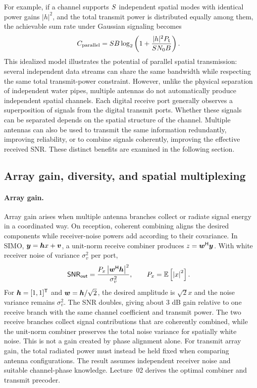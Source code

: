For example, if a channel supports $S$ independent
spatial modes with identical power gains $|h|^2$, and the total
transmit power is distributed equally among them, the achievable
sum rate under Gaussian signaling becomes
\begin{equation}
	C_{\mathrm{parallel}}
	=
	S B
	\log_2\left(
	1+
	\frac{|h|^2P_{\mathsf{t}}}
	{S N_{0} B}
	\right).
	\label{eq:parallel_channel_capacity_intro}
\end{equation}
This idealized model illustrates the potential of parallel spatial
transmission: several independent data streams can share the same
bandwidth while respecting the same total transmit-power constraint.
%
However, unlike the physical separation of independent water
pipes, multiple antennas do not automatically produce independent
spatial channels. Each digital receive port generally observes a superposition of signals from the digital transmit ports. Whether these signals can be separated depends on the
spatial structure of the channel.
%
Multiple antennas can also be used to transmit the same
information redundantly, improving reliability, or to combine
signals coherently, improving the effective received SNR.
These distinct benefits are examined in the following section.


\subsection{Array gain, diversity, and spatial multiplexing}
\paragraph{Array gain.}
Array gain arises when multiple antenna branches collect or radiate signal energy in a coordinated way. On reception, coherent combining aligns the desired components while receiver-noise powers add according to their covariance. In SIMO, $\bm{y}=\bm{h}x+\bm{v}$, a unit-norm receive combiner produces $z={\bm{w}}^{\mathsf{H}}\bm{y}$. With white receiver noise of variance $\sigma_v^2$ per port,
\begin{equation}\label{eq:array}
\mathsf{SNR}_{\mathsf{out}}=\frac{P_x\left|{\bm{w}}^{\mathsf{H}}\bm{h}\right|^2}{\sigma_v^2},\qquad P_x=\mathbb{E}\left[\left|x\right|^2\right].
\end{equation}
For $\bm{h}=[1,1]^{\mathsf T}$ and $\bm{w}=\bm{h}/\sqrt2$, the desired amplitude is $\sqrt2x$ and the noise variance remains $\sigma_v^2$. The SNR doubles, giving about 3 dB gain relative to one receive branch with the same channel coefficient and transmit power. The two receive branches collect signal contributions that are coherently combined, while the unit-norm combiner preserves the total noise variance for spatially white noise. This is not a gain created by phase alignment alone. For transmit array gain, the total radiated power must instead be held fixed when comparing antenna configurations. The result assumes independent receiver noise and suitable channel-phase knowledge. Lecture~02 derives the optimal combiner and transmit precoder.

